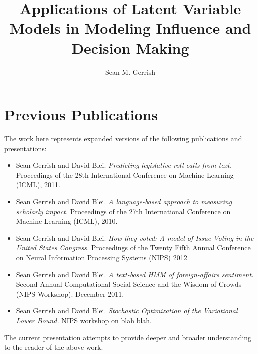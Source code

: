 \documentclass[table]{puthesis}
\author{Sean M. Gerrish}
\title{Applications of Latent Variable Models in Modeling Influence and Decision Making}
\begin{document}

\section*{Previous Publications}
The work here represents expanded versions of the following publications and presentations:
\begin{itemize}
\item Sean Gerrish and David Blei. \emph{Predicting legislative roll
    calls from text.} Proceedings of the 28th International Conference
  on Machine Learning (ICML), 2011.
\item Sean Gerrish and David Blei. \emph{A language-based approach to
    measuring scholarly impact.}  Proceedings of the 27th
  International Conference on Machine Learning (ICML), 2010.
\item Sean Gerrish and David Blei. \emph{How they voted: A model of
    Issue Voting in the United States Congress.}  Proceedings of the
  Twenty Fifth Annual Conference on Neural Information Processing
  Systems (NIPS) 2012
\item Sean Gerrish and David Blei. \emph{A text-based HMM of
    foreign-affairs sentiment.} Second Annual Computational Social
  Science and the Wisdom of Crowds (NIPS Workshop).  December 2011.
\item Sean Gerrish and David Blei. \emph{Stochastic Optimization of
    the Variational Lower Bound.} NIPS workshop on blah blah.
\end{itemize}

The current presentation attempts to provide deeper and broader
understanding to the reader of the above work.







%




% 

%





%


\end{document}

